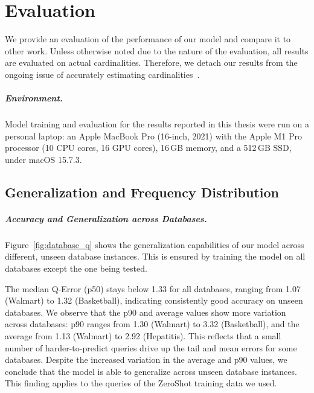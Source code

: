 
\chapter{Evaluation}\label{chapter:evaluation}

We provide an evaluation of the performance of our model and compare it to other work.
Unless otherwise noted due to the nature of the evaluation, all results are evaluated on actual cardinalities.
Therefore, we detach our results from the ongoing issue of accurately estimating cardinalities~\parencite{leis2018job}.

\paragraph{Environment.}
Model training and evaluation for the results reported in this thesis were run on a personal laptop: an Apple MacBook Pro (16-inch, 2021) with the Apple M1 Pro processor (10 CPU cores, 16 GPU cores), 16\,GB memory, and a 512\,GB SSD, under macOS 15.7.3.

\section{Generalization and Frequency Distribution}

\paragraph{Accuracy and Generalization across Databases.}
Figure~\ref{fig:database_q} shows the generalization capabilities of our model across different, unseen database instances.
This is ensured by training the model on all databases except the one being tested.

The median Q-Error (p50) stays below 1.33 for all databases,
ranging from 1.07 (Walmart) to 1.32 (Basketball),
indicating consistently good accuracy on unseen databases.
We observe that the p90 and average values show more variation across databases:
p90 ranges from 1.30 (Walmart) to 3.32 (Basketball),
and the average from 1.13 (Walmart) to 2.92 (Hepatitis).
This reflects that a small number of harder-to-predict queries
drive up the tail and mean errors for some databases.
Despite the increased variation in the average and p90 values, we conclude that the model is able to generalize across unseen database instances.
This finding applies to the queries of the ZeroShot training data we used.

